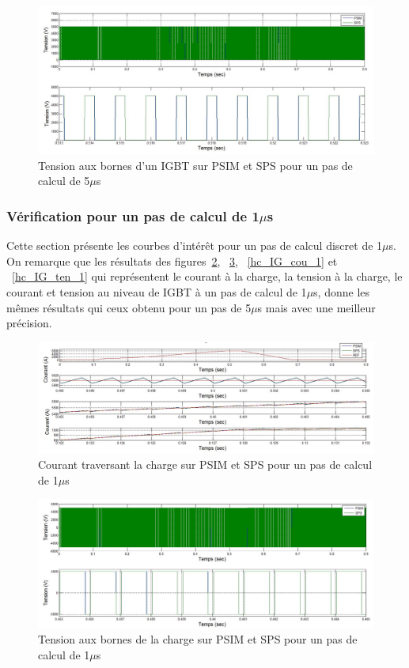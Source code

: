 \documentclass[11pt,letterpaper,final]{report}
\begin{document}
\begin{figure}[htb]
\centering
\includegraphics[scale=0.5]{Fig/Hacheur4Quadrants/HacheurTensionIGBT5u.jpg}
\caption{Tension aux bornes d'un IGBT sur PSIM et SPS pour un pas de calcul de 5$\mu$s}
\label{hc_IG_ten_5}
\end{figure}

\clearpage
\subsubsection{Vérification pour un pas de calcul de 1$\mu$s}
Cette section présente les courbes d'intérêt pour un pas de calcul discret de 1$\mu$s. On remarque que les résultats des figures~\ref{hc_cou_ch_1}, ~\ref{hc_ten_ch_1}, ~\ref{hc_IG_cou_1} et ~\ref{hc_IG_ten_1} qui représentent le courant à la charge, la tension à la charge, le courant et tension au niveau de IGBT à un pas de calcul de 1$\mu$s, donne les mêmes résultats qui ceux obtenu pour un pas de 5$\mu$s mais avec une meilleur précision. 


\begin{figure}[htb]
\centering
\includegraphics[scale=0.5]{Fig/Hacheur4Quadrants/HacheurCourantCharge1u.jpg}
\caption{Courant traversant la charge sur PSIM et SPS pour un pas de calcul de 1$\mu$s}
\label{hc_cou_ch_1}
\end{figure}


\begin{figure}[htb]
\centering
\includegraphics[scale=0.5]{Fig/Hacheur4Quadrants/HacheurTensionCharge1u.jpg}
\caption{Tension aux bornes de la charge sur PSIM et SPS pour un pas de calcul de 1$\mu$s}
\label{hc_ten_ch_1}
\end{figure}
\end{document}
